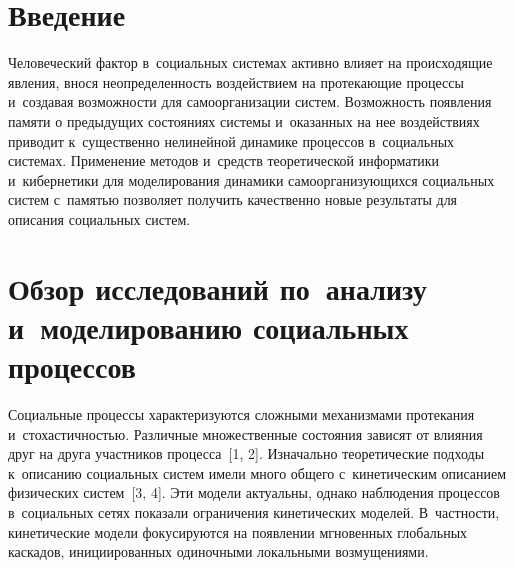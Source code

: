 

\vspace*{2.5pt}



\thispagestyle{headings}

\begin{multicols}{2}

\label{st\stat}
     
      
\section{Введение}

\vspace*{-3pt}

    Человеческий фактор в~социальных системах активно влияет на 
происходящие явления, внося неопределенность воздействием на протекающие 
процессы и~создавая возможности для самоорганизации систем. Возможность 
появления памяти о предыдущих состояниях системы и~оказанных на нее 
воздействиях приводит к~существенно нелинейной динамике процессов 
в~социальных системах. Применение методов и~средств теоретической 
информатики и~кибернетики для моделирования динамики 
самоорганизующихся социальных систем с~памятью позволяет получить 
качественно новые результаты для описания социальных сис\-тем. 

\vspace*{-9pt}
    
\section{Обзор исследований по~анализу и~моделированию 
социальных процессов}


\vspace*{-3pt}
 
    Социальные процессы характеризуются сложными механизмами 
протекания и~стохастичностью. Различные множественные состояния зависят 
от влияния друг на друга участников процесса~[1, 2]. Изначально 
теоретические подходы к~описанию социальных систем имели много общего 
с~кинетическим описанием физических систем~[3, 4]. Эти модели актуальны, 
однако наблюдения процессов в~социальных сетях показали ограничения 
кинетических моделей. В~част\-ности, кинетические модели фокусируются на 
появлении мгновенных глобальных каскадов, инициированных одиночными 
локальными возмущениями. 


\end{multicols}
